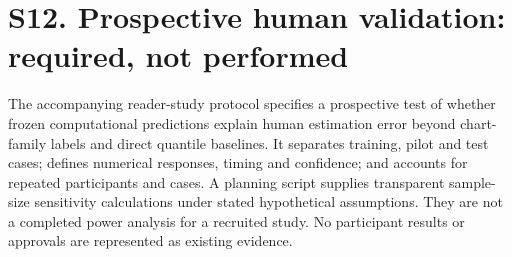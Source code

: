 \documentclass[10pt]{article}
\begin{document}
\section*{S12. Prospective human validation: required, not performed}
The accompanying reader-study protocol specifies a prospective test of whether frozen computational predictions explain human estimation error beyond chart-family labels and direct quantile baselines. It separates training, pilot and test cases; defines numerical responses, timing and confidence; and accounts for repeated participants and cases. A planning script supplies transparent sample-size sensitivity calculations under stated hypothetical assumptions. They are not a completed power analysis for a recruited study. No participant results or approvals are represented as existing evidence.
\begingroup\footnotesize\endgroup
\end{document}
